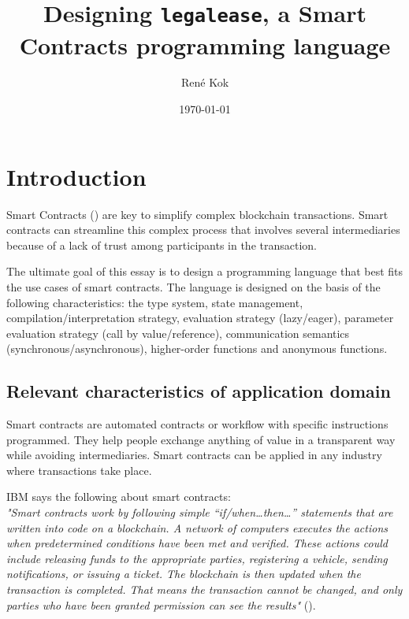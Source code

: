 \documentclass{uva-inf-article}
\title{Designing \texttt{legalease}, a Smart Contracts programming language}
\author{René Kok}
\date{\today}
\begin{document}
\maketitle



\newpage
\section{Introduction}
Smart Contracts (\cite{what-are-smart-contracts}) are key to simplify complex blockchain transactions.
Smart contracts can streamline this complex process that involves several intermediaries because of a 
lack of trust among participants in the transaction.
\vspace{5mm}

The ultimate goal of this essay is to design a programming language that best fits the use cases of smart contracts.
The language is designed on the basis of the following characteristics: 
the type system,
state management,
compilation/interpretation strategy,
evaluation strategy (lazy/eager),
parameter evaluation strategy (call by value/reference),
communication semantics (synchronous/asynchronous),
higher-order functions and anonymous functions.

\subsection{Relevant characteristics of application domain}
Smart contracts are automated contracts or workflow with specific instructions programmed.
They help people exchange anything of value in a transparent way while avoiding intermediaries.
Smart contracts can be applied in any industry where transactions take place.
\vspace{5mm}

IBM says the following about smart contracts:\\
\textit{"Smart contracts work by following simple “if/when…then…” statements that are written 
into code on a blockchain. A network of computers executes the actions  when predetermined conditions have been 
met and verified. These actions could include releasing funds to the appropriate parties, registering a vehicle, 
sending notifications, or issuing a ticket. The blockchain is then updated when the transaction is completed. 
That means the transaction cannot be changed, and only parties who have been granted permission can see the results"}
(\cite{ibm-smart-contracts}).
\vspace{5mm}
\end{document}
